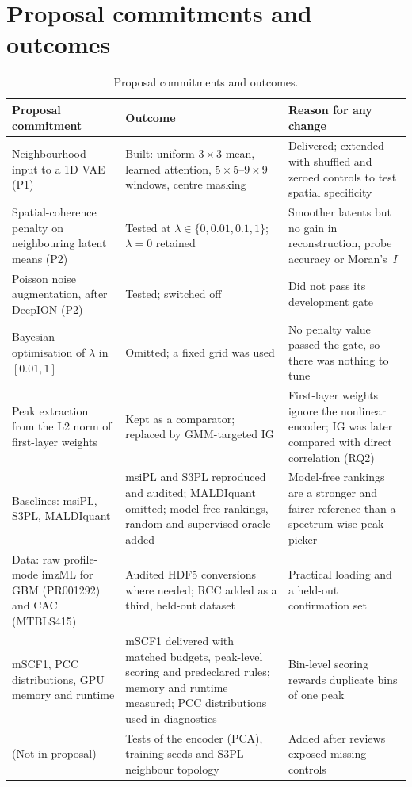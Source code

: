 \section{Proposal commitments and outcomes}
\label{app:proposal}
\begin{table}[h]
\caption{Proposal commitments and outcomes.}
\label{tab:proposal}
\centering\small
\begin{tabularx}{\textwidth}{@{}p{3.6cm}X X@{}}
\toprule
Proposal commitment & Outcome & Reason for any change \\
\midrule
Neighbourhood input to a 1D VAE (P1) & Built: uniform $3\times3$ mean, learned attention, $5\times5$--$9\times9$ windows, centre masking & Delivered; extended with shuffled and zeroed controls to test spatial specificity \\
Spatial-coherence penalty on neighbouring latent means (P2) & Tested at $\lambda\in\{0,0.01,0.1,1\}$; $\lambda=0$ retained & Smoother latents but no gain in reconstruction, probe accuracy or Moran's~$I$ \\
Poisson noise augmentation, after DeepION (P2) & Tested; switched off & Did not pass its development gate \\
Bayesian optimisation of $\lambda$ in $[0.01, 1]$ & Omitted; a fixed grid was used & No penalty value passed the gate, so there was nothing to tune \\
Peak extraction from the L2 norm of first-layer weights & Kept as a comparator; replaced by GMM-targeted IG & First-layer weights ignore the nonlinear encoder; IG was later compared with direct correlation (RQ2) \\
Baselines: msiPL, S3PL, MALDIquant & msiPL and S3PL reproduced and audited; MALDIquant omitted; model-free rankings, random and supervised oracle added & Model-free rankings are a stronger and fairer reference than a spectrum-wise peak picker \\
Data: raw profile-mode imzML for GBM (PR001292) and CAC (MTBLS415) & Audited HDF5 conversions where needed; RCC added as a third, held-out dataset & Practical loading and a held-out confirmation set \\
mSCF1, PCC distributions, GPU memory and runtime & mSCF1 delivered with matched budgets, peak-level scoring and predeclared rules; memory and runtime measured; PCC distributions used in diagnostics & Bin-level scoring rewards duplicate bins of one peak \\
(Not in proposal) & Tests of the encoder (PCA), training seeds and S3PL neighbour topology & Added after reviews exposed missing controls \\
\bottomrule
\end{tabularx}
\end{table}

